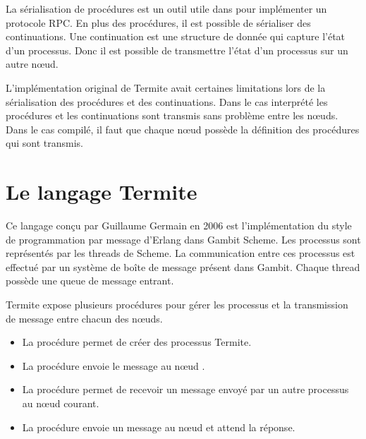 La sérialisation de procédures est un outil utile dans pour implémenter
un protocole RPC. En plus des procédures, il est possible de sérialiser
des continuations. Une continuation est une structure de donnée qui capture
l'état d'un processus. Donc il est possible de transmettre l'état d'un
processus sur un autre nœud.

L'implémentation original de Termite avait certaines limitations
lors de la sérialisation des procédures et des continuations. Dans
le cas interprété les procédures et les continuations sont transmis
sans problème entre les nœuds. Dans le cas compilé, il faut que
chaque nœud possède la définition des procédures qui sont transmis.


\section{Le langage Termite}

Ce langage conçu par Guillaume Germain en 2006 est l'implémentation
du style de programmation par message d'Erlang dans Gambit Scheme.
Les processus sont représentés par les threads de Scheme. La communication
entre ces processus est effectué par un système de boîte de message
présent dans Gambit. Chaque thread possède une queue de message entrant.

Termite expose plusieurs procédures pour gérer les processus et la transmission
de message entre chacun des nœuds.

\begin{itemize}
  \item La procédure  permet de
    créer des processus Termite.

  \item La procédure  envoie le message
     au nœud .

  \item La procédure  permet de recevoir un message
    envoyé par un autre processus au nœud courant.


  \item La procédure  envoie un message au
    nœud  et attend la réponse.
\end{itemize}



